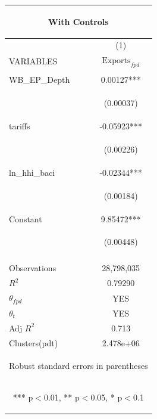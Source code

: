 \documentclass[]{article}
\begin{document}
\begin{center}
\begin{tabular}{lc}
\multicolumn{2}{c}{\begin{large}With Controls\end{large}} \\ \hline
 & (1) \\
VARIABLES & $\text{Exports}_{fpd}$ \\ \hline
\vspace{4pt} & \begin{footnotesize}\end{footnotesize} \\
WB\_EP\_Depth & 0.00127*** \\
\vspace{4pt} & \begin{footnotesize}(0.00037)\end{footnotesize} \\
tariffs & -0.05923*** \\
\vspace{4pt} & \begin{footnotesize}(0.00226)\end{footnotesize} \\
ln\_hhi\_baci & -0.02344*** \\
\vspace{4pt} & \begin{footnotesize}(0.00184)\end{footnotesize} \\
Constant & 9.85472*** \\
 & \begin{footnotesize}(0.00448)\end{footnotesize} \\
\vspace{4pt} & \begin{footnotesize}\end{footnotesize} \\
Observations & 28,798,035 \\
$R^2$ & 0.79290 \\
$\theta_{fpd}$ & YES \\
$\theta_t$ & YES \\
Adj $R^2$ & 0.713 \\
 Clusters(pdt) & 2.478e+06 \\ \hline
\multicolumn{2}{c}{\begin{footnotesize} Robust standard errors in parentheses\end{footnotesize}} \\
\multicolumn{2}{c}{\begin{footnotesize} *** p$<$0.01, ** p$<$0.05, * p$<$0.1\end{footnotesize}} \\
\end{tabular}
\end{center}
\end{document}
